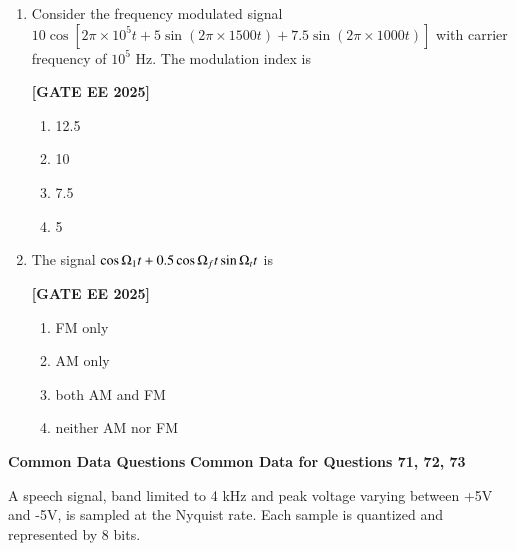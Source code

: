 \documentclass[12pt]{article}
\begin{document}
\begin{enumerate}[leftmargin=*, label=\textbf{Q.\arabic*:}]
\noindent \textbf{[GATE EE 2025]}
\begin{multicols}{4}
\begin{enumerate}
  \item $W$
  \item $3W$
  \item $6W$
  \item $7W$
\end{enumerate}
\end{multicols}

\item Consider the frequency modulated signal $10\cos[2\pi \times 10^5 t + 5\sin(2\pi \times 1500 t) + 7.5\sin(2\pi \times 1000 t)]$ with carrier frequency of $10^5$ Hz. The modulation index is
 
\noindent \textbf{[GATE EE 2025]}
\begin{multicols}{4}
\begin{enumerate}
  \item 12.5
  \item 10
  \item 7.5
  \item 5
\end{enumerate}
\end{multicols}

\item The signal $\cos \ohm_1 t + 0.5 \cos \ohm_f t \sin \ohm_t t$ is
 
\noindent \textbf{[GATE EE 2025]}
\begin{multicols}{2}
\begin{enumerate}
  \item FM only
  \item AM only
  \item both AM and FM
  \item neither AM nor FM
\end{enumerate}
\end{multicols}

\end{enumerate}


 \large \textbf {Common Data Questions}
 \large \textbf {Common Data for Questions 71, 72, 73}

 
A speech signal, band limited to 4 kHz and peak voltage varying between +5V and -5V, is sampled at the Nyquist rate. Each sample is quantized and represented by 8 bits.
\end{document}
